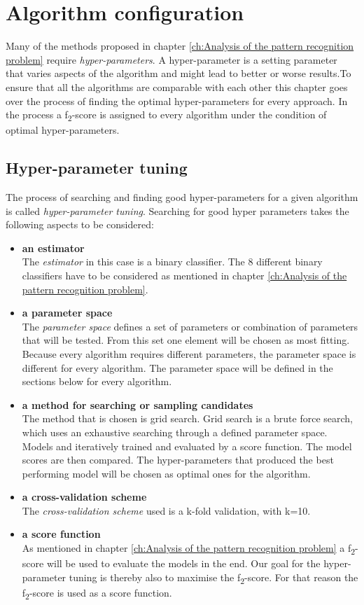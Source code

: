 \chapter{Algorithm configuration}
\label{ch:Algorithm configuration}
Many of the methods proposed in chapter \ref{ch:Analysis of the pattern recognition problem} require \emph{hyper-parameters}.  A hyper-parameter is a setting parameter that varies aspects of the algorithm and might lead to better or worse results.To ensure that all the algorithms are comparable with each other this chapter goes over the process of finding the optimal hyper-parameters for every approach. In the process a f\textsubscript{2}-score is assigned to every algorithm under the condition of optimal hyper-parameters.
\section*{Hyper-parameter tuning}
The process of searching and finding good hyper-parameters for a given algorithm is called \emph{hyper-parameter tuning}. Searching for good hyper parameters takes the following aspects to be considered:
\begin{itemize}
\item{ \textbf{an estimator}} \\
The  \emph{estimator} in this case is a binary classifier. The 8 different binary classifiers have to be considered as mentioned in chapter \ref{ch:Analysis of the pattern recognition problem}.
\item{\textbf{a parameter space}} \\
The  \emph{parameter space} defines a set of parameters or combination of parameters that will be tested. From this set one element will be chosen as most fitting. Because every algorithm requires different parameters, the parameter space is different for every algorithm. The parameter space will be defined in the sections below for every algorithm. 
\item{\textbf{a method for searching or sampling candidates}}\\
The method that is chosen is grid search. Grid search is a brute force search, which uses an exhaustive searching through a defined parameter space. Models and iteratively trained and evaluated by a score function. The model scores are then compared. The hyper-parameters that produced the best performing model will be chosen as optimal ones for the algorithm.
\item{\textbf{a cross-validation scheme}} \\
The  \emph{cross-validation scheme} used is a k-fold validation, with k=10.
\item{\textbf{a score function}}\\
As mentioned in chapter \ref{ch:Analysis of the pattern recognition problem}  a  f\textsubscript{2}-score will be used to evaluate the models in the end. Our goal for the hyper-parameter tuning is thereby also to maximise the  f\textsubscript{2}-score. For that reason the  f\textsubscript{2}-score is used as a score function.
\end{itemize}


